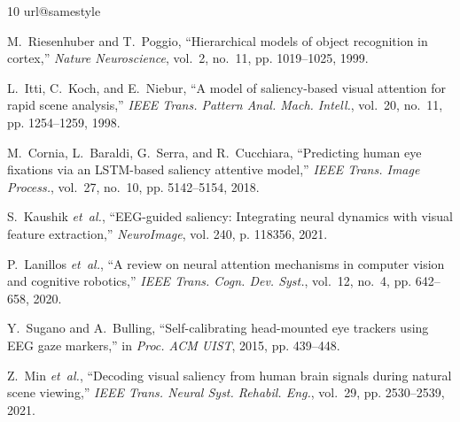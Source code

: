 \documentclass[journal,twocolumn]{IEEEtran}
\begin{document}

\begin{thebibliography}{10}
\providecommand{\url}[1]{#1}
\csname url@samestyle\endcsname
\providecommand{\newblock}{\relax}
\providecommand{\bibinfo}[2]{#2}
\providecommand{\BIBentrySTDinterwordspacing}{\spaceskip=0pt\relax}
\providecommand{\BIBentryALTinterwordstretchfactor}{4}
\providecommand{\BIBentryALTinterwordspacing}{\spaceskip=\fontdimen2\font plus
\BIBentryALTinterwordstretchfactor\fontdimen3\font minus
  \fontdimen4\font\relax}
\providecommand{\BIBforeignlanguage}[2]{{%
\expandafter\ifx\csname l@#1\endcsname\relax
\typeout{** WARNING: IEEEtran.bst: No hyphenation pattern has been}%
\typeout{** loaded for the language `#1'. Using the pattern for}%
\typeout{** the default language instead.}%
\else
\language=\csname l@#1\endcsname
\fi
#2}}
\providecommand{\BIBdecl}{\relax}
\BIBdecl

M.~Riesenhuber and T.~Poggio, ``Hierarchical models of object recognition in cortex,'' \emph{Nature Neuroscience}, vol.~2, no.~11, pp. 1019--1025, 1999.

L.~Itti, C.~Koch, and E.~Niebur, ``A model of saliency-based visual attention for rapid scene analysis,'' \emph{IEEE Trans. Pattern Anal. Mach. Intell.}, vol.~20, no.~11, pp. 1254--1259, 1998.

M.~Cornia, L.~Baraldi, G.~Serra, and R.~Cucchiara, ``Predicting human eye fixations via an {LSTM}-based saliency attentive model,'' \emph{IEEE Trans. Image Process.}, vol.~27, no.~10, pp. 5142--5154, 2018.

S.~Kaushik \emph{et~al.}, ``{EEG}-guided saliency: Integrating neural dynamics with visual feature extraction,'' \emph{NeuroImage}, vol. 240, p. 118356, 2021.

P.~Lanillos \emph{et~al.}, ``A review on neural attention mechanisms in computer vision and cognitive robotics,'' \emph{IEEE Trans. Cogn. Dev. Syst.}, vol.~12, no.~4, pp. 642--658, 2020.

Y.~Sugano and A.~Bulling, ``Self-calibrating head-mounted eye trackers using {EEG} gaze markers,'' in \emph{Proc. ACM UIST}, 2015, pp. 439--448.

Z.~Min \emph{et~al.}, ``Decoding visual saliency from human brain signals during natural scene viewing,'' \emph{IEEE Trans. Neural Syst. Rehabil. Eng.}, vol.~29, pp. 2530--2539, 2021.


\end{thebibliography}
\end{document}

